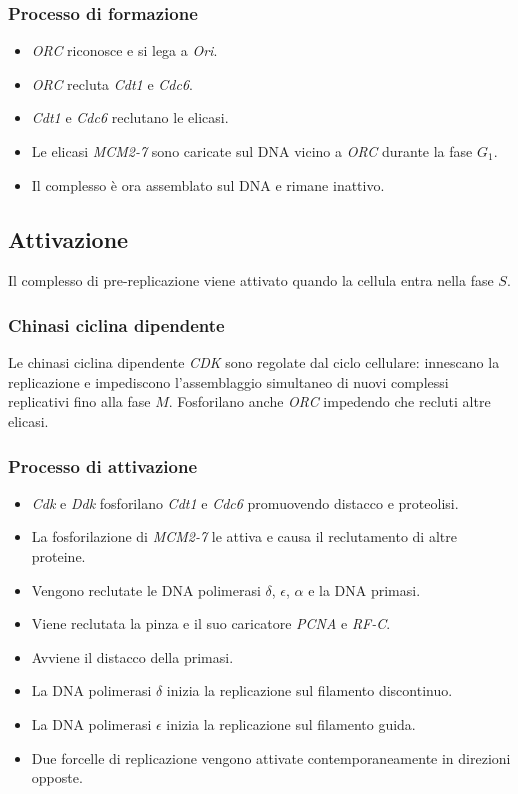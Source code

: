 		\subsubsection{Processo di formazione}
		\begin{multicols}{2}
			\begin{itemize}
				\item \emph{ORC} riconosce e si lega a \emph{Ori}.
				\item \emph{ORC} recluta \emph{Cdt1} e \emph{Cdc6}.
				\item \emph{Cdt1} e \emph{Cdc6} reclutano le elicasi.
				\item Le elicasi \emph{MCM2-7} sono caricate sul DNA vicino a \emph{ORC} durante la fase $G_1$.
				\item Il complesso \`e ora assemblato sul DNA e rimane inattivo.
			\end{itemize}
		\end{multicols}
		
	\subsection{Attivazione}
	Il complesso di pre-replicazione viene attivato quando la cellula entra nella fase $S$.

		\subsubsection{Chinasi ciclina dipendente}
		Le chinasi ciclina dipendente \emph{CDK} sono regolate dal ciclo cellulare: innescano la replicazione e impediscono l'assemblaggio simultaneo di nuovi complessi replicativi fino alla fase $M$.
		Fosforilano anche \emph{ORC} impedendo che recluti altre elicasi.

		\subsubsection{Processo di attivazione}
		\begin{multicols}{2}
			\begin{itemize}
				\item \emph{Cdk} e \emph{Ddk} fosforilano \emph{Cdt1} e \emph{Cdc6} promuovendo distacco e proteolisi.
				\item La fosforilazione di \emph{MCM2-7} le attiva e causa il reclutamento di altre proteine.
				\item Vengono reclutate le DNA polimerasi $\delta$, $\epsilon$, $\alpha$ e la DNA primasi.
				\item Viene reclutata la pinza e il suo caricatore \emph{PCNA} e \emph{RF-C}.
				\item Avviene il distacco della primasi.
				\item La DNA polimerasi $\delta$ inizia la replicazione sul filamento discontinuo.
				\item La DNA polimerasi $\epsilon$ inizia la replicazione sul filamento guida.
				\item Due forcelle di replicazione vengono attivate contemporaneamente in direzioni opposte.
			\end{itemize}
		\end{multicols}

